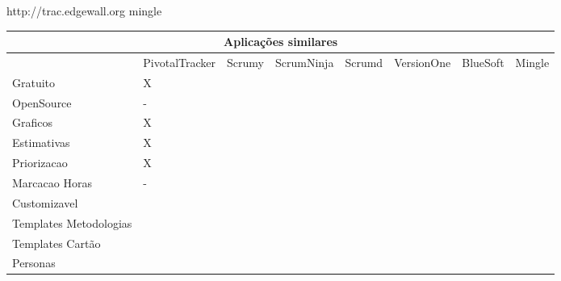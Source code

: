 http://trac.edgewall.org
mingle

\begin{sidewaystable}
	\begin{tabular}{|l|l|l|l|l|l|l|l}
		\hline
		\multicolumn{8}{|c|}{Aplicações similares} \\
		\hline
		 & PivotalTracker & Scrumy & ScrumNinja & Scrumd & VersionOne & BlueSoft & Mingle \\
		Gratuito & X & & & & & & \\
		OpenSource & - & & & & & & \\
		Graficos & X & & & & & & \\
		Estimativas & X & & & & & & \\
		Priorizacao & X & & & & & & \\
		Marcacao Horas & - & & & & & & \\
		Customizavel & & & & & & & \\
		Templates Metodologias & & & & & & & \\
		Templates Cartão & & & & & & & \\
		Personas & & & & & & & \\
		\hline
	\end{tabular}
\end{sidewaystable}


